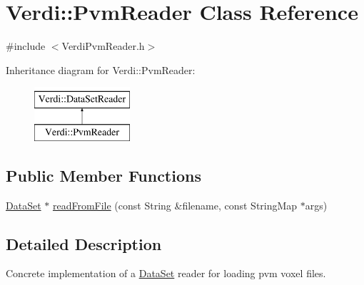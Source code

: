 \hypertarget{class_verdi_1_1_pvm_reader}{\section{\-Verdi\-:\-:\-Pvm\-Reader \-Class \-Reference}
\label{class_verdi_1_1_pvm_reader}
}


{\ttfamily \#include $<$\-Verdi\-Pvm\-Reader.\-h$>$}

\-Inheritance diagram for \-Verdi\-:\-:\-Pvm\-Reader\-:\begin{figure}[H]
\begin{center}
\leavevmode
\includegraphics[height=2.000000cm]{class_verdi_1_1_pvm_reader}
\end{center}
\end{figure}
\subsection*{\-Public \-Member \-Functions}
\begin{DoxyCompactItemize}
\item 
\hyperlink{class_verdi_1_1_data_set}{\-Data\-Set} $\ast$ \hyperlink{class_verdi_1_1_pvm_reader_a52a3436351a1af75cb05dc563aafa3f0}{read\-From\-File} (const \-String \&filename, const \-String\-Map $\ast$args)
\end{DoxyCompactItemize}


\subsection{\-Detailed \-Description}
\-Concrete implementation of a \hyperlink{class_verdi_1_1_data_set}{\-Data\-Set} reader for loading pvm voxel files. 

